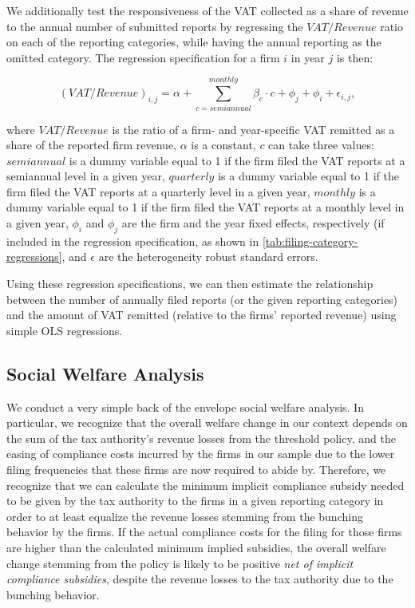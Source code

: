We additionally test the responsiveness of the VAT collected as a share of revenue to the annual number of submitted reports by regressing the $VAT/Revenue$ ratio on each of the reporting categories, while having the annual reporting as the omitted category. The regression specification for a firm $i$ in year $j$ is then:

\begin{equation}
  (VAT/Revenue)_{i,j}=\alpha+\sum_{c=semiannual}^{monthly}\beta_{c}\cdot c+\phi_{j}+\phi_{i}+\epsilon_{i,j},
\end{equation}

where $VAT/Revenue$ is the ratio of a firm- and year-specific VAT remitted as a share of the reported firm revenue, $\alpha$ is a constant, $c$ can take three values: $semiannual$ is a dummy variable equal to 1 if the firm filed the VAT reports at a semiannual level in a given year, $quarterly$ is a dummy variable equal to 1 if the firm filed the VAT reports at a quarterly level in a given year, $monthly$ is a dummy variable equal to 1 if the firm filed the VAT reports at a monthly level in a given year, $\phi_{i}$ and $\phi_{j}$ are the firm and the year fixed effects, respectively (if included in the regression specification, as shown in \cref{tab:filing-category-regressions}, and $\epsilon$ are the heterogeneity robust standard errors.

Using these regression specifications, we can then estimate the relationship between the number of annually filed reports (or the given reporting categories) and the amount of VAT remitted (relative to the firms' reported revenue) using simple OLS regressions.

\subsection{Social Welfare Analysis}
\label{subsec:3-methodology-welfare-analysis}
We conduct a very simple back of the envelope social welfare analysis. In particular, we recognize that the overall welfare change in our context depends on the sum of the tax authority's revenue losses from the threshold policy, and the easing of compliance costs incurred by the firms in our sample due to the lower filing frequencies that these firms are now required to abide by. Therefore, we recognize that we can calculate the minimum implicit compliance subsidy needed to be given by the tax authority to the firms in a given reporting category in order to at least equalize the revenue losses stemming from the bunching behavior by the firms. If the actual compliance costs for the filing for those firms are higher than the calculated minimum implied subsidies, the overall welfare change stemming from the policy is likely to be positive \textit{net of implicit compliance subsidies}, despite the revenue losses to the tax authority due to the bunching behavior.

